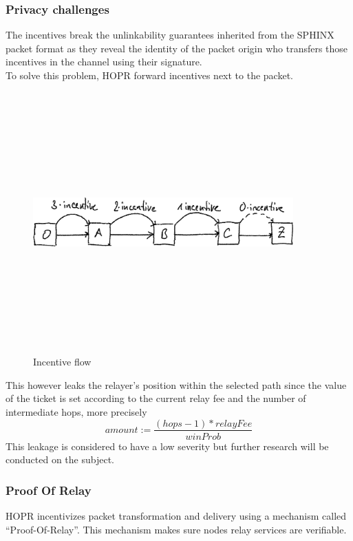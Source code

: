 \subsubsection*{Privacy challenges}
The incentives break the unlinkability guarantees inherited from the SPHINX packet format as they reveal the identity of the packet origin who transfers those incentives in the channel using their signature. 
\\To solve this problem, HOPR forward incentives next to the packet.
\begin{figure}[H]
    \centering
    \includegraphics[width=10cm,height=10cm,keepaspectratio]{../whitepaper/images/token_cashflow.png}
    \caption{Incentive flow}
    \label{fig:Incentive flow}
    \end{figure}

    \hspace{-5mm}This however leaks the relayer’s position within the selected path since the value of the ticket is set according to the current relay fee and the number of intermediate hops, 
more precisely $$amount:=\frac{(hops -1)* relayFee}{winProb}$$
This leakage is considered to have a low severity but further research will be conducted on the subject.
\subsubsection{Proof Of Relay}

HOPR incentivizes packet transformation and delivery using a mechanism called “Proof-Of-Relay”. 
This mechanism makes sure nodes relay services are verifiable.
